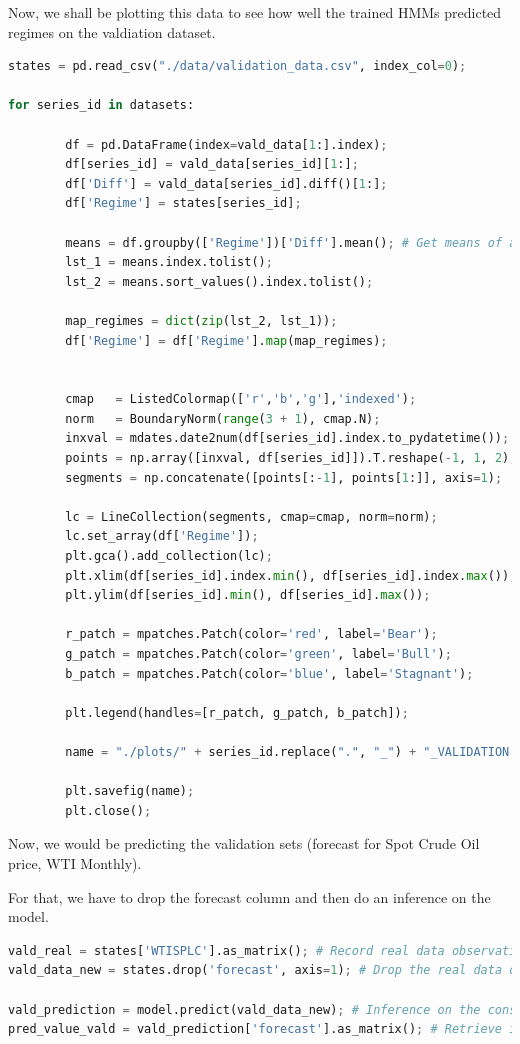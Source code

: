 Now, we shall be plotting this data to see how well the trained HMMs
predicted regimes on the valdiation dataset.

\begin{lstlisting}[language=Python]
states = pd.read_csv("./data/validation_data.csv", index_col=0);

for series_id in datasets:
    
        df = pd.DataFrame(index=vald_data[1:].index);
        df[series_id] = vald_data[series_id][1:];
        df['Diff'] = vald_data[series_id].diff()[1:];
        df['Regime'] = states[series_id];
        
        means = df.groupby(['Regime'])['Diff'].mean(); # Get means of all assigned states
        lst_1 = means.index.tolist();
        lst_2 = means.sort_values().index.tolist();

        map_regimes = dict(zip(lst_2, lst_1));
        df['Regime'] = df['Regime'].map(map_regimes);
        
        
        cmap   = ListedColormap(['r','b','g'],'indexed');
        norm   = BoundaryNorm(range(3 + 1), cmap.N);
        inxval = mdates.date2num(df[series_id].index.to_pydatetime());
        points = np.array([inxval, df[series_id]]).T.reshape(-1, 1, 2);
        segments = np.concatenate([points[:-1], points[1:]], axis=1);

        lc = LineCollection(segments, cmap=cmap, norm=norm);
        lc.set_array(df['Regime']);
        plt.gca().add_collection(lc);
        plt.xlim(df[series_id].index.min(), df[series_id].index.max());
        plt.ylim(df[series_id].min(), df[series_id].max());

        r_patch = mpatches.Patch(color='red', label='Bear');
        g_patch = mpatches.Patch(color='green', label='Bull');
        b_patch = mpatches.Patch(color='blue', label='Stagnant');

        plt.legend(handles=[r_patch, g_patch, b_patch]);

        name = "./plots/" + series_id.replace(".", "_") + "_VALIDATION.png";

        plt.savefig(name);
        plt.close();
\end{lstlisting}

Now, we would be predicting the validation sets (forecast for Spot Crude
Oil price, WTI Monthly).

For that, we have to drop the forecast column and then do an inference
on the model.

\begin{lstlisting}[language=Python]
vald_real = states['WTISPLC'].as_matrix(); # Record real data observation, to be compared with the predicted one
vald_data_new = states.drop('forecast', axis=1); # Drop the real data observation so that it does not bias prediction

vald_prediction = model.predict(vald_data_new); # Inference on the constructed graphical model
pred_value_vald = vald_prediction['forecast'].as_matrix(); # Retrieve it as an array so we can compare with real value
\end{lstlisting}

